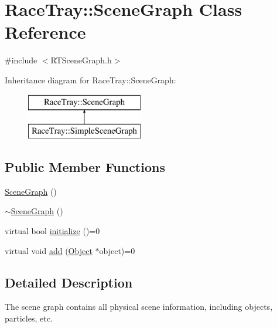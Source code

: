 \hypertarget{class_race_tray_1_1_scene_graph}{\section{Race\-Tray\-:\-:Scene\-Graph Class Reference}
\label{class_race_tray_1_1_scene_graph}
}


{\ttfamily \#include $<$R\-T\-Scene\-Graph.\-h$>$}

Inheritance diagram for Race\-Tray\-:\-:Scene\-Graph\-:\begin{figure}[H]
\begin{center}
\leavevmode
\includegraphics[height=2.000000cm]{class_race_tray_1_1_scene_graph}
\end{center}
\end{figure}
\subsection*{Public Member Functions}
\begin{DoxyCompactItemize}
\item 
\hyperlink{class_race_tray_1_1_scene_graph_a515e791e169aedb48a8ce7d1ccf2ee98}{Scene\-Graph} ()
\item 
\hyperlink{class_race_tray_1_1_scene_graph_ae773263e5bf2b68eacb517c679e9e0c4}{$\sim$\-Scene\-Graph} ()
\item 
virtual bool \hyperlink{class_race_tray_1_1_scene_graph_ac6fcc253f175397971d742747b1bbc6f}{initialize} ()=0
\item 
virtual void \hyperlink{class_race_tray_1_1_scene_graph_a856688d0b5182658c8e9d62bfbc54d6c}{add} (\hyperlink{class_race_tray_1_1_object}{Object} $\ast$object)=0
\end{DoxyCompactItemize}


\subsection{Detailed Description}
The scene graph contains all physical scene information, including objects, particles, etc. 

